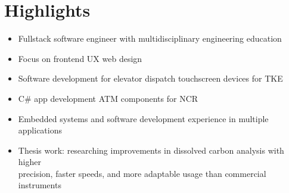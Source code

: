 \documentclass[]{resume}
\begin{document}
\section{Highlights}
    \begin{itemize}
        \item {Fullstack software engineer with multidisciplinary engineering education}
        \item {Focus on frontend UX web design}
        \item {Software development for elevator dispatch touchscreen devices for TKE}
        \item {C\# app development ATM components for NCR}
        \item {Embedded systems and software development experience in multiple applications}
        \item {Thesis work: researching improvements in dissolved carbon analysis with higher \\precision, faster speeds, and more adaptable usage than commercial instruments}
    \end{itemize}
~
\end{document}
